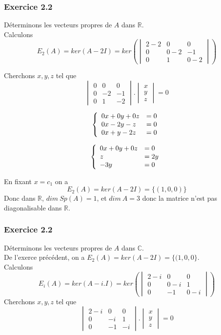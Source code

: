 \documentclass[]{book}
\theoremstyle{definition}
\newcommand{\bb}[1]{\mathbb{#1}}
\newcommand{\R}{\bb{R}}
\newcommand{\C}{\bb{C}}
\begin{document}
\subsubsection*{Exercice 2.2}
D\'eterminons les vecteurs propres de $A$ dans $\R$.\\
Calculons 
$$E_{2}(A)=ker(A-2I) = ker\left( \begin{vmatrix} 2 - 2 & 0 & 0 \\ 0 & 0-2  & -1 \\  0 & 1 & 0 - 2 \end{vmatrix} \right)$$

Cherchons $x,y,z$ tel que
$$\begin{vmatrix} 0 & 0 & 0 \\ 0 & -2 & -1 \\  0 & 1 & -2 \end{vmatrix} . \begin{vmatrix} x \\ y \\  z \end{vmatrix} = 0$$

$$
\left\{ 
\begin{array}{l l}
0x  + 0y + 0z & = 0\\
0x  -2y - z & = 0\\
0x +y -2z & = 0\\
\end{array}
\right. 
$$ 

$$
\left\{ 
\begin{array}{l l}
0x  + 0y + 0z & = 0\\
z & = 2y\\
-3y & = 0\\
\end{array}
\right. 
$$ 

En fixant $x=c_1$ on a 
$$E_{2}(A)=ker(A-2I) = \{(1,0,0)\}$$
Donc dans $\R$, $dim\ Sp(A) = 1$, et $dim\ A = 3$ donc la matrice n'est pas diagonalisable dans $\R$.


\subsubsection*{Exercice 2.2}
D\'eterminons les vecteurs propres de $A$ dans $\C$.\\
De l'exerce pr\'ec\'edent, on a $E_{2}(A)=ker(A-2I) = \{(1,0,0\}$.\\
Calculons 
$$E_{i}(A)=ker(A-i.I) = ker\left( \begin{vmatrix} 2 - i & 0 & 0 \\ 0 & 0-i  & 1 \\  0 & -1 & 0 - i \end{vmatrix} \right)$$
Cherchons $x,y,z$ tel que
$$\begin{vmatrix} 2-i & 0 & 0 \\ 0 & -i & 1 \\  0 & -1 & -i \end{vmatrix} . \begin{vmatrix} x \\ y \\  z \end{vmatrix} = 0$$
\end{document}
